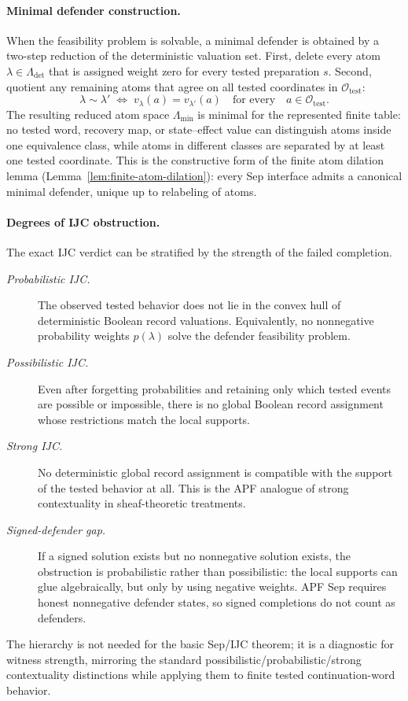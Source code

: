 \documentclass[11pt]{article}
\begin{document}
\paragraph{Minimal defender construction.}
When the feasibility problem is solvable, a minimal defender is
obtained by a two-step reduction of the deterministic valuation set.
First, delete every atom $\lambda\in\Lambda_{\mathrm{det}}$ that is
assigned weight zero for every tested preparation $s$.  Second,
quotient any remaining atoms that agree on all tested coordinates
in $\mathcal O_{\mathrm{test}}$:
\[
    \lambda\sim\lambda'
    \;\Longleftrightarrow\;
    v_\lambda(a)=v_{\lambda'}(a)
    \quad\text{for every}\quad a\in\mathcal O_{\mathrm{test}}.
\]
The resulting reduced atom space $\Lambda_{\mathrm{min}}$ is minimal
for the represented finite table: no tested word, recovery map, or
state--effect value can distinguish atoms inside one equivalence
class, while atoms in different classes are separated by at least
one tested coordinate.  This is the constructive form of the
finite atom dilation lemma
(Lemma~\ref{lem:finite-atom-dilation}): every Sep interface admits a
canonical minimal defender, unique up to relabeling of atoms.

\paragraph{Degrees of IJC obstruction.}
The exact IJC verdict can be stratified by the strength of the
failed completion.
\begin{description}
\item[\emph{Probabilistic IJC.}]
The observed tested behavior does not lie in the convex hull of
deterministic Boolean record valuations.  Equivalently, no
nonnegative probability weights $p(\lambda)$ solve the defender
feasibility problem.
\item[\emph{Possibilistic IJC.}]
Even after forgetting probabilities and retaining only which tested
events are possible or impossible, there is no global Boolean
record assignment whose restrictions match the local supports.
\item[\emph{Strong IJC.}]
No deterministic global record assignment is compatible with the
support of the tested behavior at all.  This is the APF analogue of
strong contextuality in sheaf-theoretic treatments.
\item[\emph{Signed-defender gap.}]
If a signed solution exists but no nonnegative solution exists, the
obstruction is probabilistic rather than possibilistic: the local
supports can glue algebraically, but only by using negative
weights.  APF Sep requires honest nonnegative defender states, so
signed completions do not count as defenders.
\end{description}
The hierarchy is not needed for the basic Sep/IJC theorem; it is a
diagnostic for witness strength, mirroring the standard
possibilistic/probabilistic/strong contextuality distinctions while
applying them to finite tested continuation-word behavior.
\end{document}
